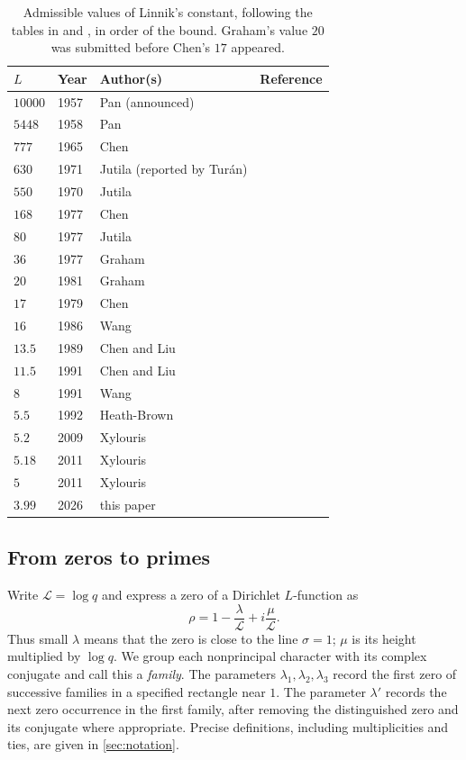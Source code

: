 \documentclass[11pt]{amsart}
\numberwithin{equation}{section}
\theoremstyle{plain}
\theoremstyle{definition}
\theoremstyle{remark}
\newcommand{\LL}{\mathcal{L}}
\newcommand{\1}{\mathbf{1}}
\begin{document}
\begin{table}[ht]
\centering
\begin{tabular}{llll}
\toprule
$L$ & Year & Author(s) & Reference \\
\midrule
$10000$ & 1957 & Pan (announced) & \cite{Pan1957least} \\
$5448$ & 1958 & Pan & \cite{Pan1958least} \\
$777$ & 1965 & Chen & \cite{Chen1965least} \\
$630$ & 1971 & Jutila (reported by Tur\'an) & \cite{Turan1971recent} \\
$550$ & 1970 & Jutila & \cite{Jutila1970new} \\
$168$ & 1977 & Chen & \cite{Chen1977least} \\
$80$ & 1977 & Jutila & \cite{Jutila1977linnik} \\
$36$ & 1977 & Graham & \cite{Graham1977thesis} \\
$20$ & 1981 & Graham & \cite{Graham1981linnik} \\
$17$ & 1979 & Chen & \cite{Chen1979least} \\
$16$ & 1986 & Wang & \cite{Wang1986least} \\
$13.5$ & 1989 & Chen and Liu & \cite{ChenLiu1989III,ChenLiu1989IV} \\
$11.5$ & 1991 & Chen and Liu & \cite{ChenLiu1991V} \\
$8$ & 1991 & Wang & \cite{Wang1991least} \\
$5.5$ & 1992 & Heath-Brown & \cite{HeathBrown1992zero} \\
$5.2$ & 2009 & Xylouris & \cite{Xylouris2009linnik} \\
$5.18$ & 2011 & Xylouris & \cite{Xylouris2011least} \\
$5$ & 2011 & Xylouris & \cite{Xylouris2011nullstellen,Xylouris2018linnik} \\
\midrule
$3.99$ & 2026 & this paper & \\
\bottomrule
\end{tabular}
\caption{Admissible values of Linnik's constant, following the tables in
\cite{HeathBrown1992zero} and \cite{Xylouris2011least}, in order of the bound. Graham's value $20$
was submitted before Chen's $17$ appeared.}
\label{tab:history}
\end{table}

\subsection{From zeros to primes}\label{subsec:outline}
Write $\LL=\log q$ and express a zero of a Dirichlet $L$-function as
\[
  \rho=1-\frac{\lambda}{\LL}+i\frac{\mu}{\LL}.
\]
Thus small $\lambda$ means that the zero is close to the line $\sigma=1$; $\mu$ is its
height multiplied by $\log q$. We group each nonprincipal character with its complex
conjugate and call this a \emph{family}. The parameters $\lambda_1,\lambda_2,\lambda_3$
record the first zero of successive families in a specified rectangle near $1$.
The parameter $\lambda'$ records the next zero occurrence in the first family, after
removing the distinguished zero and its conjugate where appropriate. Precise definitions,
including multiplicities and ties, are given in \cref{sec:notation}.
\end{document}
